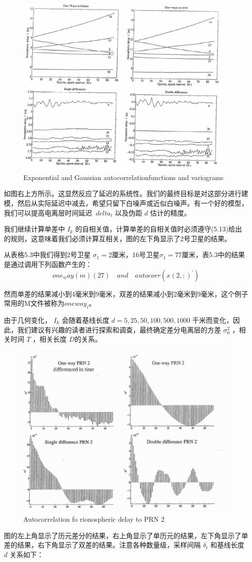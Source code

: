  
 \begin{figure}[h]
 	\centering
 	\includegraphics[width=0.7\linewidth]{TeX_files/Part02/chapter05/image/7}
 	\caption{Exponential and Gaussian autocorrelationfunctions and variograms}
 	\label{}
 \end{figure}
 
 如图右上方所示。这显然反应了延迟的系统性。我们的最终目标是对这部分进行建模，然后从实际延迟中减去，希望只留下白噪声或近似白噪声。有一个好的模型，我们可以提高电离层时间延迟 $ \ delta_ {t} $ 以及伪距 $ d $ 估计的精度。
 
 我们继续计算单差中  $ I_{k} $  的自相关值，计算单差的自相关值时必须遵守(5.13)给出的规则，这意味着我们必须计算互相关，图的左下角显示了2号卫星的结果。
 
 从表格5.3中我们得到2号卫星 $ \sigma_{1}=2 $厘米，16号卫星$ \sigma_{1}=77 $厘米，表5.3中的结果是通过调用下列函数产生的：
  \[ one_way(m)(27)\quad and \quad autocorr(x(2,:)^{'}) \]
  
  然而单差的结果减小到4毫米到9毫米，双差的结果减小到2毫米到9毫米，这个例子常用的M文件被称为$ oneway_{i} $。
  
  由于几何变化， $ I_{k} $ 会随着基线长度 $  d = 5, 25, 50, 100,500, 1000 $ 千米而变化，因此，我们建议有兴趣的读者进行探索和调查，最终确定差分电离层的方差 $ \sigma_{0}^{2} $ ，相关时间 $  T  $ ，相关长度 $ D $的关系。
  
  \begin{figure}[h]
  	\centering
  	\includegraphics[width=0.7\linewidth]{TeX_files/Part02/chapter05/image/8}
  	\caption{Autocorrelation fo rionospheric delay to PRN 2}
  	\label{ }
  \end{figure}
   图的左上角显示了历元差分的结果，右上角显示了单历元的结果，左下角显示了单差的结果，右下角显示了双差的结果。注意各种数量级，采样间隔 $ \delta_{t} $ 和基线长度 $ d $ 关系如下：
   
